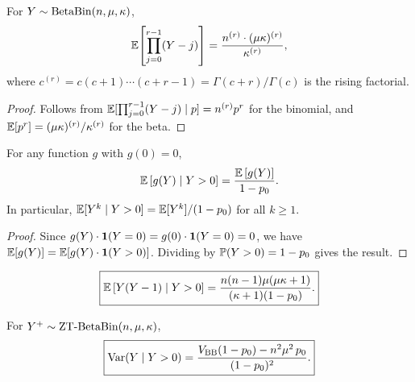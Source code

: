 
\begin{lemma}\label{sma:lem-rth-factorial}
  For $Y \sim \operatorname{BetaBin}(n,\mu,\kappa)$,
  \begin{equation}\label{sma:eq-rth-factorial}
    \mathbb{E}\!\left[\prod_{j=0}^{r-1}(Y-j)\right]
    = \frac{n^{(r)} \cdot (\mu\kappa)^{(r)}}{\kappa^{(r)}},
  \end{equation}
  where $c^{(r)} = c(c+1)\cdots(c+r-1) = \Gamma(c+r)/\Gamma(c)$ is the
  rising factorial.
\end{lemma}

\begin{proof}
  Follows from
  $\mathbb{E}[\prod_{j=0}^{r-1}(Y-j) \mid p] = n^{(r)}p^r$ for the binomial, and
  $\mathbb{E}[p^r] = (\mu\kappa)^{(r)}/\kappa^{(r)}$ for the beta.
\end{proof}


\begin{proposition}
  \label{sma:prop-trunc-identity}
  For any function $g$ with $g(0) = 0$,
  \begin{equation}\label{sma:eq-trunc-identity}
    \mathbb{E}\left[{g(Y) \mid Y > 0}\right] = \frac{\mathbb{E}\left[{g(Y)}\right]}{1 - p_0}.
  \end{equation}
  In particular,
  $\mathbb{E}[Y^k \mid Y > 0] = \mathbb{E}[Y^k]/(1-p_0)$ for all $k \ge 1$.
\end{proposition}

\begin{proof}
  Since $g(Y) \cdot \mathbf{1}(Y = 0) = g(0) \cdot \mathbf{1}(Y = 0) = 0$, we have
  $\mathbb{E}[g(Y)] = \mathbb{E}[g(Y) \cdot \mathbf{1}(Y > 0)]$.  Dividing by
  $\mathbb{P}(Y > 0) = 1 - p_0$ gives the result.
\end{proof}


\begin{corollary}
  \label{sma:cor-cond-second-factorial}
  \begin{equation}\label{sma:eq-cond-second-factorial}
    \boxed{\mathbb{E}\left[{Y(Y-1) \mid Y > 0}\right]
    = \frac{n(n-1)\mu(\mu\kappa+1)}{(\kappa+1)(1-p_0)}.}
  \end{equation}
\end{corollary}


\begin{proposition}
  \label{sma:prop-trunc-var}
  For $Y^+ \sim \operatorname{ZT\text{-}BetaBin}(n,\mu,\kappa)$,
  \begin{equation}\label{sma:eq-trunc-var}
    \boxed{\operatorname*{Var}(Y \mid Y > 0)
    = \frac{V_{\mathrm{BB}}(1-p_0) - n^2\mu^2\,p_0}{(1-p_0)^2}.}
  \end{equation}
\end{proposition}

